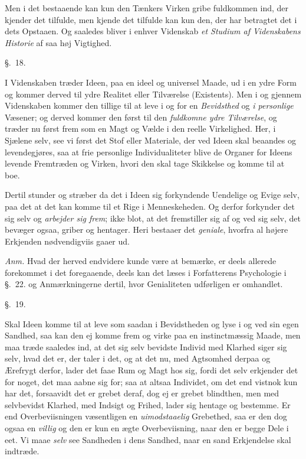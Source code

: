 \documentclass[12pt,a4paper]{book}
\newcommand{\apage}[1]{\marginnote{\footnotesize\textit{[#1]}}}
\begin{document}
Men i det bestaaende kan kun den Tænkers Virken gribe fuldkommen ind, der kjender
det tilfulde, men kjende det tilfulde kan kun den, der har betragtet det i dets
Opstaaen. Og saaledes bliver i enhver Videnskab \emph{et Studium af Videnskabens
Historie} af saa høj Vigtighed.

\begin{center}\large\S.~18.\end{center}

I Videnskaben træder Ideen, paa en ideel og universel Maade, ud i en ydre Form og
kommer derved til ydre Realitet eller Tilværelse (Existents). Men i og gjennem
Videnskaben kommer den tillige til at leve i og for en \emph{Bevidsthed} og \emph{i personlige}
Væsener; og derved kommer den først til den \emph{fuldkomne ydre Tilværelse}, og
træder nu først frem som en Magt og Vælde i den reelle Virkelighed. Her, i Sjælene
selv, see vi først det Stof eller Materiale, der ved Ideen skal beaandes og
levendegjøres, saa at frie personlige Individualiteter blive de Organer for Ideens
levende Fremtræden og Virken, hvori den skal tage Skikkelse og komme til at boe.

Dertil stunder og stræber da det i Ideen sig forkyndende Uendelige og Evige selv,
paa det at  \apage{160} det kan komme til et Rige i Menneskeheden. Og derfor forkynder det sig
selv og \emph{arbejder sig frem}; ikke blot, at det fremstiller sig af og ved sig
selv, det bevæger ogsaa, griber og hentager. Heri bestaaer det \emph{geniale},
hvorfra al højere Erkjenden nødvendigviis gaaer ud.

\emph{Anm.} Hvad der herved endvidere kunde være at bemærke, er deels allerede
forekommet i det foregaaende, deels kan det læses i Forfatterens Psychologie i
§.~22. og Anmærkningerne dertil, hvor Genialiteten udførligen er omhandlet.

\begin{center}\large\S.~19.\end{center}

Skal Ideen komme til at leve som saadan i Bevidstheden og lyse i og ved sin egen
Sandhed, saa kan den ej komme frem og virke paa en instinctmæssig Maade, men maa
træde saaledes ind, at det sig selv bevidste Individ med Klarhed siger sig selv,
hvad det er, der taler i det, og at det nu, med Agtsomhed derpaa og Ærefrygt
derfor, lader det faae Rum og Magt hos sig, fordi det selv erkjender det for noget,
det maa aabne sig for; saa at altsaa Individet, om det end vistnok kun har det,
forsaavidt det er grebet deraf, dog ej er grebet blindthen, men med selvbevidst
Klarhed, med Indsigt og Frihed, lader sig hentage og bestemme. Er end
Overbeviisningen væsentligen en \emph{uimodstaaelig} Grebethed, saa er den dog \apage{161}  ogsaa en
\emph{villig} og den er kun en ægte Overbeviisning, naar den er begge Dele i eet. Vi maae
\emph{selv} see Sandheden i dens Sandhed, naar en sand Erkjendelse skal indtræde.
\end{document}
